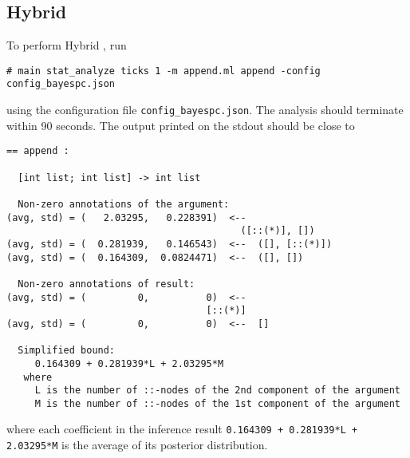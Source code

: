 \subsection{Hybrid \BayesPC{}}

To perform Hybrid \BayesPC{}, run
\begin{verbatim}
# main stat_analyze ticks 1 -m append.ml append -config config_bayespc.json
\end{verbatim}
using the configuration file \texttt{config\_bayespc.json}.
%
The analysis should terminate within 90 seconds.
%
The output printed on the stdout should be close to
\begin{verbatim}
== append :

  [int list; int list] -> int list

  Non-zero annotations of the argument:
(avg, std) = (   2.03295,   0.228391)  <--
                                         ([::(*)], [])
(avg, std) = (  0.281939,   0.146543)  <--  ([], [::(*)])
(avg, std) = (  0.164309,  0.0824471)  <--  ([], [])

  Non-zero annotations of result:
(avg, std) = (         0,          0)  <--
                                   [::(*)]
(avg, std) = (         0,          0)  <--  []

  Simplified bound:
     0.164309 + 0.281939*L + 2.03295*M
   where
     L is the number of ::-nodes of the 2nd component of the argument
     M is the number of ::-nodes of the 1st component of the argument
\end{verbatim}
where each coefficient in the inference result \texttt{0.164309 + 0.281939*L +
  2.03295*M} is the average of its posterior distribution.
